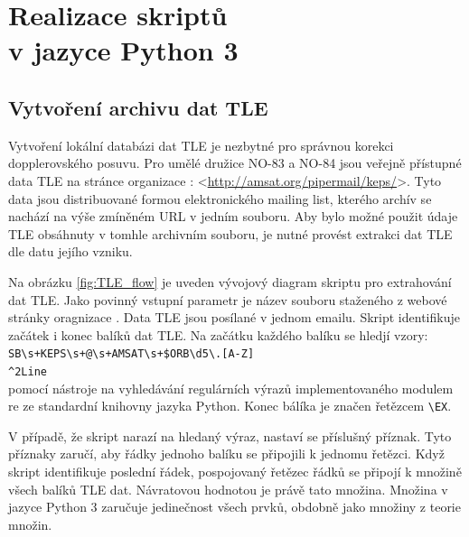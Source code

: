 \chapter[Realizace skriptů v jazyce Python 3]{Realizace skriptů\\ v jazyce Python 3}
\label{chap:python3}

\section{Vytvoření archivu dat TLE}
  Vytvoření lokální databázi dat TLE je nezbytné pro správnou korekci dopplerovského posuvu. Pro umělé družice NO-83 a NO-84 jsou veřejně přístupné data TLE na stránce organizace : <\url{http://amsat.org/pipermail/keps/}>. Tyto data jsou distribuované formou elektronického mailing list, kterého archív se nachází na výše zmíněném URL v jedním souboru. Aby bylo možné použit údaje TLE obsáhnuty v tomhle archivním souboru, je nutné provést extrakci dat TLE dle datu jejího vzniku.

  Na obrázku \ref{fig:TLE_flow} je uveden vývojový diagram skriptu pro extrahování dat TLE. Jako povinný vstupní parametr je název souboru staženého z webové stránky oragnizace . Data TLE jsou posílané v jednom emailu. Skript identifikuje začátek i konec balíků dat TLE. Na začátku každého balíku se hledjí vzory:\\
  \texttt{SB\textbackslash s+KEPS\textbackslash s+@\textbackslash s+AMSAT\textbackslash s+\$ORB\textbackslash d{5}\textbackslash.[A-Z]}\\
  \texttt{\textasciicircum 2Line}\\
  pomocí nástroje na vyhledávání regulárních výrazů implementovaného modulem re ze standardní knihovny jazyka Python. Konec bálíka je značen řetězcem
  \texttt{\textbackslash EX}.

  V případě, že skript narazí na hledaný výraz, nastaví se příslušný příznak. Tyto příznaky zaručí, aby řádky jednoho balíku se připojili k jednomu řetězci. Když skript identifikuje poslední řádek, pospojovaný řetězec řádků se připojí k množině všech balíků TLE dat. Návratovou hodnotou je právě tato množina. Množina v jazyce Python 3 zaručuje jedinečnost všech prvků, obdobně jako množiny z teorie množin.


